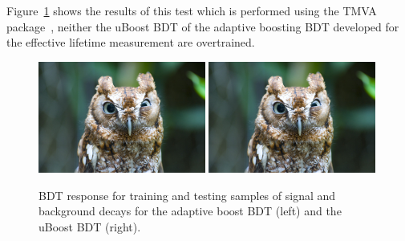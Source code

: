 Figure~\ref{fig:ELBDTovertrain} shows the results of this test which is performed using the TMVA package~\cite{Hocker:2007ht}, neither the uBoost BDT of the adaptive boosting BDT developed for the effective lifetime measurement are overtrained. %

\begin{figure}[htbp]
   \centering
        \includegraphics[width=0.49\textwidth]{./Figs/placeholder.jpeg}
        \includegraphics[width=0.49\textwidth]{./Figs/placeholder.jpeg}

    \caption{BDT response for training and testing samples of signal and background decays for the adaptive boost BDT (left) and the uBoost BDT (right). }
    \label{fig:ELBDTovertrain}
\end{figure}






